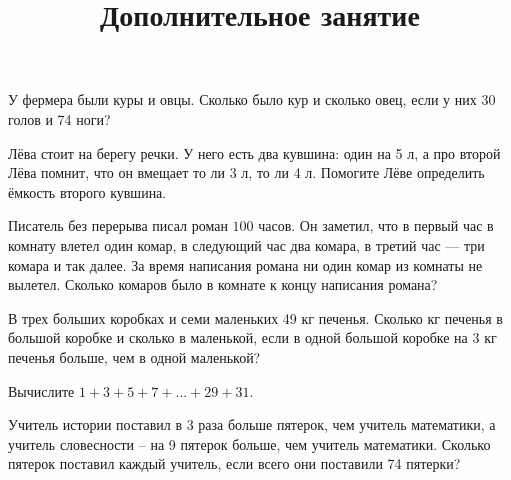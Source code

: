 %	
\newpage
\title{Дополнительное занятие}
\begin{listofex}
	\item У фермера были куры и овцы. Сколько было кур и сколько овец, если у
	них 30 голов и 74 ноги?
	\item Лёва стоит на берегу речки. У него есть два кувшина: один на 5 л, а про второй Лёва помнит, что он вмещает то ли 3 л, то ли 4 л. Помогите Лёве определить ёмкость второго
	кувшина.
	\item Писатель без перерыва писал роман \( 100 \) часов. Он заметил, что в первый час в комнату влетел один комар, в следующий час два комара, в третий час --- три комара и так далее. За время написания романа ни один комар из комнаты не вылетел. Сколько комаров было в комнате к концу написания романа?
	\item В трех больших коробках и семи маленьких 49 кг печенья. Сколько кг печенья в большой коробке и сколько в маленькой, если в одной большой коробке на 3 кг печенья больше, чем в
	одной маленькой?
	\item Вычислите \( 1+3+5+7+...+29+31 \).
	\item Учитель истории поставил в 3 раза больше пятерок, чем учитель математики, а учитель
	словесности – на 9 пятерок больше, чем учитель математики. Сколько пятерок поставил
	каждый учитель, если всего они поставили 74 пятерки?
\end{listofex}